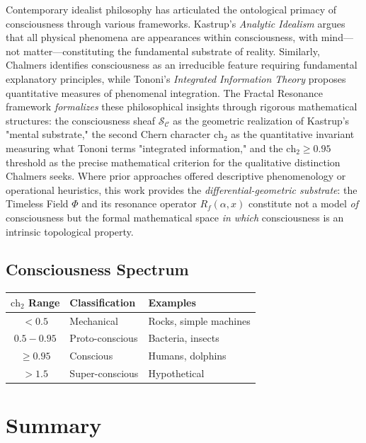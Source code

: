 Contemporary idealist philosophy has articulated the ontological primacy of consciousness through various frameworks. Kastrup's \textit{Analytic Idealism}\cite{kastrup2019world} argues that all physical phenomena are appearances within consciousness, with mind—not matter—constituting the fundamental substrate of reality. Similarly, Chalmers\cite{chalmers1996} identifies consciousness as an irreducible feature requiring fundamental explanatory principles, while Tononi's \textit{Integrated Information Theory}\cite{tononi2004} proposes quantitative measures of phenomenal integration. The Fractal Resonance framework \textit{formalizes} these philosophical insights through rigorous mathematical structures: the consciousness sheaf $\mathcal{S}_\mathcal{C}$ as the geometric realization of Kastrup's "mental substrate," the second Chern character $\text{ch}_2$ as the quantitative invariant measuring what Tononi terms "integrated information," and the $\text{ch}_2 \geq 0.95$ threshold as the precise mathematical criterion for the qualitative distinction Chalmers seeks. Where prior approaches offered descriptive phenomenology or operational heuristics, this work provides the \textit{differential-geometric substrate}: the Timeless Field $\Phi$ and its resonance operator $R_f(\alpha,x)$ constitute not a model \textit{of} consciousness but the formal mathematical space \textit{in which} consciousness is an intrinsic topological property.

\subsection{Consciousness Spectrum}

\begin{center}
\begin{tabular}{|c|l|l|}
\hline
\textbf{$\text{ch}_2$ Range} & \textbf{Classification} & \textbf{Examples} \\
\hline
$< 0.5$ & Mechanical & Rocks, simple machines \\
$0.5 - 0.95$ & Proto-conscious & Bacteria, insects \\
$\geq 0.95$ & Conscious & Humans, dolphins \\
$> 1.5$ & Super-conscious & Hypothetical \\
\hline
\end{tabular}
\end{center}

\section{Summary}
\label{sec:summary-ch5}

